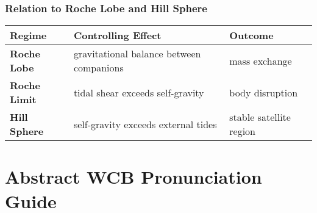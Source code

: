 \documentclass[
  letterpaper,
]{book}
\begin{document}
\subsection{Relation to Roche Lobe and Hill
Sphere}\label{relation-to-roche-lobe-and-hill-sphere}

\begin{longtable}[]{@{}
  >{\raggedright\arraybackslash}p{}
  >{\raggedright\arraybackslash}p{}
  >{\raggedright\arraybackslash}p{}@{}}
\toprule\noalign{}
\begin{minipage}[b]{\linewidth}\raggedright
Regime
\end{minipage} & \begin{minipage}[b]{\linewidth}\raggedright
Controlling Effect
\end{minipage} & \begin{minipage}[b]{\linewidth}\raggedright
Outcome
\end{minipage} \\
\midrule\noalign{}
\endhead
\bottomrule\noalign{}
\endlastfoot
\textbf{Roche Lobe} & gravitational balance between companions & mass
exchange \\
\textbf{Roche Limit} & tidal shear exceeds self-gravity & body
disruption \\
\textbf{Hill Sphere} & self-gravity exceeds external tides & stable
satellite region \\
\end{longtable}


\chapter{Abstract WCB Pronunciation
Guide}\label{abstract-wcb-pronunciation-guide}
\end{document}
